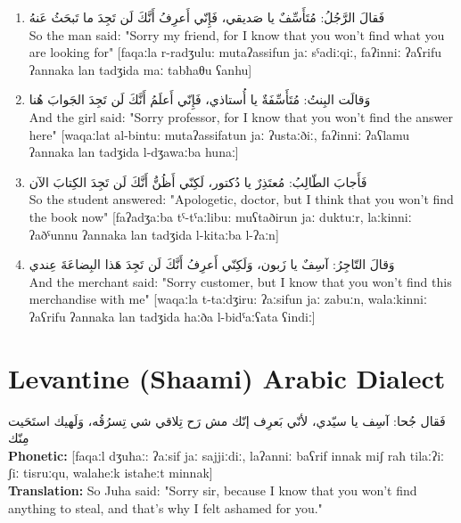 \documentclass[a4paper,12pt]{article}
\begin{document}
\begin{enumerate}
\item \textarabic{فَقالَ الرَّجُلُ: مُتَأَسِّفٌ يا صَديقي، فَإِنّي أَعرِفُ أَنَّكَ لَن تَجِدَ ما تَبحَثُ عَنهُ}\\
So the man said: "Sorry my friend, for I know that you won't find what you are looking for" [faqaːla r-radʒulu: mutaʔassifun jaː sˤadiːqiː, faʔinniː ʔaʕrifu ʔannaka lan tadʒida maː tabħaθu ʕanhu]

\item \textarabic{وَقالَت البِنتُ: مُتَأَسِّفَةٌ يا أُستاذي، فَإِنّي أَعلَمُ أَنَّكَ لَن تَجِدَ الجَوابَ هُنا}\\
And the girl said: "Sorry professor, for I know that you won't find the answer here" [waqaːlat al-bintu: mutaʔassifatun jaː ʔustaːðiː, faʔinniː ʔaʕlamu ʔannaka lan tadʒida l-dʒawaːba hunaː]

\item \textarabic{فَأَجابَ الطّالِبُ: مُعتَذِرٌ يا دُكتور، لَكِنّي أَظُنُّ أَنَّكَ لَن تَجِدَ الكِتابَ الآن}\\
So the student answered: "Apologetic, doctor, but I think that you won't find the book now" [faʔadʒaːba tˤ-tˤaːlibu: muʕtaðirun jaː duktuːr, laːkinniː ʔaðˤunnu ʔannaka lan tadʒida l-kitaːba l-ʔaːn]

\item \textarabic{وَقالَ التّاجِرُ: آسِفٌ يا زَبون، وَلَكِنّي أَعرِفُ أَنَّكَ لَن تَجِدَ هَذا البِضاعَةَ عِندي}\\
And the merchant said: "Sorry customer, but I know that you won't find this merchandise with me" [waqaːla t-taːdʒiru: ʔaːsifun jaː zabuːn, walaːkinniː ʔaʕrifu ʔannaka lan tadʒida haːða l-bidˤaːʕata ʕindiː]
\end{enumerate}

\section{Levantine (Shaami) Arabic Dialect}

\begin{tcolorbox}[colback=white,colframe=dialectcolor,title=\textbf{Levantine Version}]
\textarabic{فَقال جُحا: آسِف يا سيّدي، لأنّي بَعرِف إنّك مش رَح تِلاقي شي تِسرُقُه، وَلَهيك استَحَيت مِنّك}\\
\textbf{Phonetic:} [faqaːl dʒuħaː: ʔaːsif jaː sajjiːdiː, laʔanniː baʕrif innak miʃ raħ tilaːʔiː ʃiː tisruːqu, walaheːk istaħeːt minnak]\\
\textbf{Translation:} So Juha said: "Sorry sir, because I know that you won't find anything to steal, and that's why I felt ashamed for you."
\end{tcolorbox}
\end{document}
